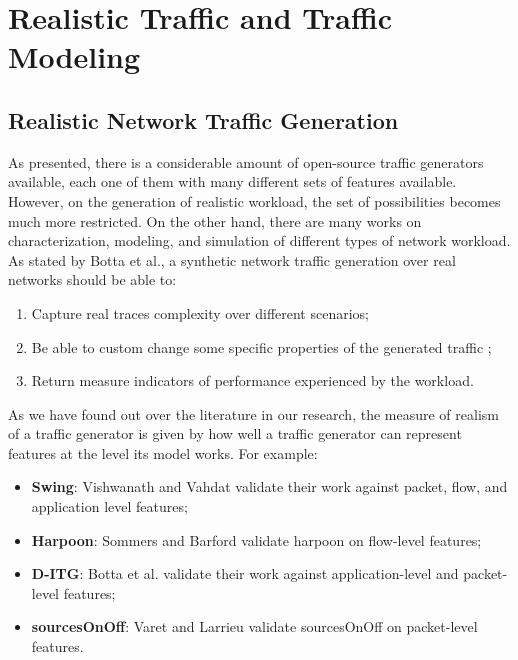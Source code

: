 \section{Realistic Traffic and Traffic Modeling}\label{sec:modeling-traffic}

\subsection{Realistic Network Traffic Generation}

As presented, there is a considerable amount of open-source traffic generators available, each one of them with many different sets of features available. However, on the generation of realistic workload, the set of possibilities becomes much more restricted. On the other hand, there are many works on characterization, modeling, and simulation of different types of network workload. As stated by Botta et al.\cite{ditg-paper}, a synthetic network traffic generation over real networks should be able to: 

\begin{enumerate}
\item Capture real traces complexity over different scenarios;
\item Be able to custom change some specific properties of the generated traffic ;
\item Return measure indicators of performance experienced by the workload.
\end{enumerate}


As we have found out over the literature in our research, the measure of realism of a traffic generator is given by how well a traffic generator can represent features at the level its model works. For example:

\begin{itemize}
\item \textbf{Swing}: Vishwanath and Vahdat\cite{swing-paper} validate their work against packet, flow, and application level features;
\item \textbf{Harpoon}: Sommers and Barford\cite{harpoon-validation} validate harpoon on flow-level features;
\item \textbf{D-ITG}: Botta et al.\cite{ditg-paper} validate their work against application-level and packet-level features;
\item \textbf{sourcesOnOff}: Varet and Larrieu validate sourcesOnOff on packet-level features\cite{sourcesonoff-paper}. 
\end{itemize}

